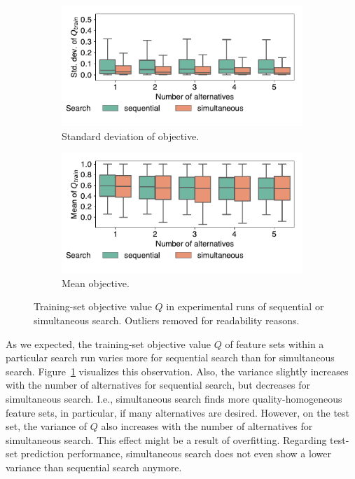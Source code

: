 \documentclass{article}
\theoremstyle{definition}
\begin{document}
\begin{figure}[htb]
	\centering
	\begin{subfigure}{0.48\textwidth}
		\centering
		\includegraphics[width=\textwidth, trim=5 25 10 10, clip]{plots/impact-search-stddev-objective.pdf}
		\caption{Standard deviation of objective.}
		\label{fig:impact-search-stddev-objective}
	\end{subfigure}
	\hfill
	\begin{subfigure}{0.48\textwidth}
		\centering
		\includegraphics[width=\textwidth, trim=5 25 10 10, clip]{plots/impact-search-mean-objective.pdf}
		\caption{Mean objective.}
		\label{fig:impact-search-mean-objective}
	\end{subfigure}
	\caption{Training-set objective value $Q$ in experimental runs of sequential or simultaneous search.
	Outliers removed for readability reasons.}
	\label{fig:impact-search-objective}
\end{figure}

As we expected, the training-set objective value $Q$ of feature sets within a particular search run varies more for sequential search than for simultaneous search.
Figure~\ref{fig:impact-search-stddev-objective} visualizes this observation.
Also, the variance slightly increases with the number of alternatives for sequential search, but decreases for simultaneous search.
I.e., simultaneous search finds more quality-homogeneous feature sets, in particular, if many alternatives are desired.
However, on the test set, the variance of $Q$ also increases with the number of alternatives for simultaneous search.
This effect might be a result of overfitting.
Regarding test-set prediction performance, simultaneous search does not even show a lower variance than sequential search anymore.
\end{document}
